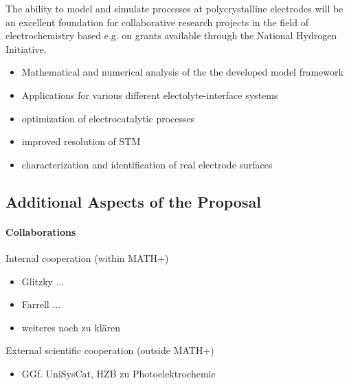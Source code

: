 \documentclass[a4paper,10pt]{article}
\begin{document}
The ability to model and simulate processes at polycrystalline electrodes will be an excellent foundation
for collaborative research projects in the field of electrochemistry based e.g. on grants available through
the National Hydrogen Initiative.

\begin{itemize}
\item Mathematical and numerical  analysis  of the the developed model framework
\item Applications for various different electolyte-interface systems
\item optimization of electrocatalytic processes
\item improved resolution of STM
\item characterization and identification of real electrode surfaces
\end{itemize}





\subsection*{Additional Aspects of the Proposal}

\paragraph{Collaborations}

Internal cooperation (within MATH+)
\begin{itemize}
\item Glitzky ...
\item Farrell ...
\item weiteres noch zu klären
\end{itemize}

External scientific cooperation (outside MATH+)
\begin{itemize}
\item GGf. UniSysCat, HZB zu Photoelektrochemie
\end{itemize}
\end{document}
